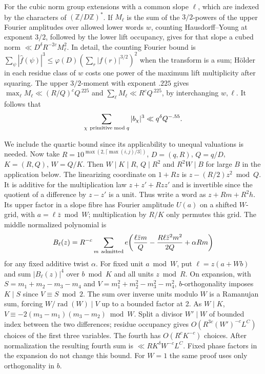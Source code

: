\documentclass[11pt,a4paper]{article}
\theoremstyle{paperplain}
\numberwithin{equation}{section}
\begin{document}
For the cubic norm group extensions with a common slope \(\ell\),
which are indexed by the characters of \((\mathbb Z/D\mathbb Z)^*\).
If \(M_\ell\) is the sum of the \(3/2\)-powers of the upper Fourier
amplitudes over allowed lower words \(w\), counting Hausdorff--Young
at exponent \(3/2\), followed by the lower lift occupancy, gives for
that slope a cubed norm \(\ll D^\delta R^{-2c}M_\ell^2\).
In detail, the counting Fourier bound is
\(\sum_\psi|\widehat f(\psi)|^3\le \varphi(D)(\sum_r |f(r)|^{3/2})^2\)
when the transform is a sum; Hölder in each residue class of \(w\)
costs one power of the maximum lift multiplicity after squaring.
The upper \(3/2\)-moment with exponent \(.225\) gives
\(\max_\ell M_\ell\ll (R/Q)^c Q^{.225}\) and
\(\sum_\ell M_\ell\ll R^c Q^{.225}\), by interchanging \(w,\ell\).
It follows that
\begin{equation}\label{dt:analytic-cubic}
 \sum_{\chi\ {\rm primitive}\bmod q}|b_\chi|^3
   \ll q^\delta Q^{-.55}.
\end{equation}

We include the quartic bound since its applicability to unequal
valuations is needed. Now take
\(R=10^{\max(2,\lceil\max(i,j)/3\rceil)}\),
\(D=(q,R)\), \(Q=q/D\), \(K=(R,Q)\), \(W=Q/K\).
Then \(W\mid K\mid R\), \(Q\mid R^2\) and \(R^2W\mid B\) for large \(B\)
in the application below. The linearizing coordinate on \(1+Rz\)
is \(z-(R/2)z^2\bmod Q\). It is additive for the multiplication
law \(z+z'+Rzz'\) and is invertible since the quotient of a
difference by \(z-z'\) is a unit. Thus write a word as \(z+Rm+R^2h\).
Its upper factor in a slope fibre has Fourier amplitude \(U(a)\)
on a shifted \(W\)-grid, with \(a=\ell\bar z\bmod W\); multiplication
by \(R/K\) only permutes this grid. The middle normalized polynomial is
\[
 B_\ell(z)=R^{-c}\sum_{m\ {\rm admitted}}e\!\left(
     \frac{\ell\bar z m}{Q}-\frac{R\ell\bar z^2m^2}{2Q}+\alpha Rm\right)
\]
for any fixed additive twist \(\alpha\).
For fixed unit \(a\bmod W\), put \(\ell=z(a+Wb)\) and sum
\(|B_\ell(z)|^4\) over \(b\bmod K\) and all units \(z\bmod R\).
On expansion, with \(S=m_1+m_2-m_3-m_4\) and
\(V=m_1^2+m_2^2-m_3^2-m_4^2\), \(b\)-orthogonality imposes \(K\mid S\)
since \(V\equiv S\bmod2\). The sum over inverse units modulo \(W\)
is a Ramanujan sum, forcing \(W/\operatorname{rad}(W)\mid V\)
up to a bounded factor at 2. As \(W\mid K\),
\(V\equiv-2(m_3-m_1)(m_3-m_2)\bmod W\).
Split a divisor \(W'\mid W\) of bounded index between the two
differences; residue occupancy gives \(O(R^{3c}(W')^{-c}L^C)\) choices
of the first three variables. The fourth has \(O(R^c K^{-c})\) choices.
After normalization the resulting fourth sum is
\(\ll R K^\delta W^{-c}L^C\). Fixed phase factors in the expansion
do not change this bound. For \(W=1\) the same proof uses only
orthogonality in \(b\).
\end{document}

